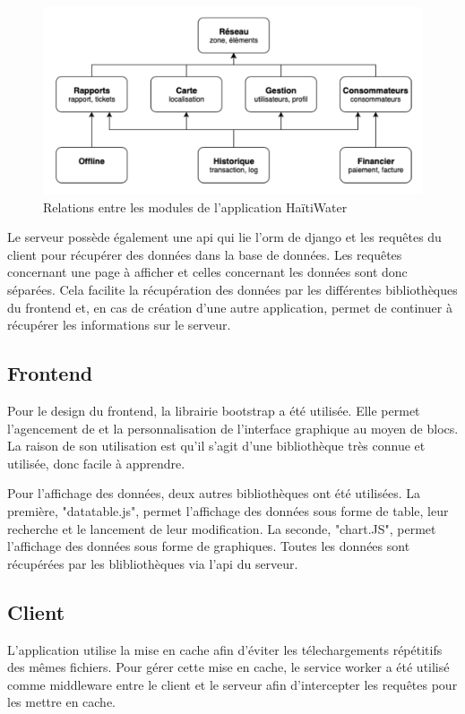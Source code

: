 \documentclass{EPL-master-thesis-covers-FR}
\begin{document}
				\begin{figure}[H]
					\centering
					\includegraphics[width=1\textwidth]{images/modules}
					\caption{Relations entre les modules de l'application HaïtiWater}
					\label{fig:modules}
				\end{figure}						
				
				Le serveur possède également une \gls{api} qui lie l'\gls{orm} de \Gls{django} et les requêtes du client pour récupérer des données dans la base de données. Les requêtes concernant une page à afficher et celles concernant les données sont donc séparées. Cela facilite la récupération des données par les différentes bibliothèques du frontend et, en cas de création d'une autre application, permet de continuer à récupérer les informations sur le serveur.
						
			\subsection*{Frontend}
				Pour le design du frontend, la librairie bootstrap a été utilisée. Elle permet l'agencement de et la personnalisation de l'interface graphique au moyen de blocs. La raison de son utilisation est qu'il s'agit d'une bibliothèque très connue et utilisée, donc facile à apprendre.
				
				Pour l'affichage des données, deux autres bibliothèques ont été utilisées. La première, "datatable.js", permet l'affichage des données sous forme de table, leur recherche et le lancement de leur modification. La seconde, "chart.JS", permet l'affichage des données sous forme de graphiques. Toutes les données sont récupérées par les blibliothèques via l'\gls{api} du serveur.
				
			\subsection*{Client}
				L'application utilise la mise en cache afin d'éviter les télechargements répétitifs des mêmes fichiers. Pour gérer cette mise en cache, le service worker a été utilisé comme \gls{middleware} entre le client et le serveur afin d'intercepter les requêtes pour les mettre en cache.
\end{document}
